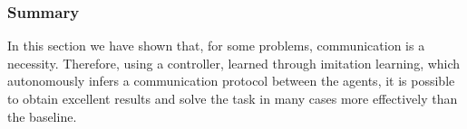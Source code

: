 \subsubsection{Summary}
\label{subsubsec:summary1}
In this section we have shown that, for some problems, communication is a 
necessity. 
Therefore, using a controller, learned through imitation learning, which 
autonomously infers a communication protocol between the agents, it is possible 
to obtain excellent results and solve the task in many cases more effectively than 
the baseline.
 

